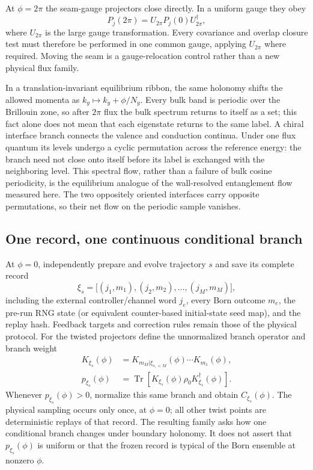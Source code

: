 \documentclass[aps,prx,twocolumn,floatfix,nofootinbib,superscriptaddress,longbibliography]{revtex4-2}
\newcommand{\qTr}{\operatorname{Tr}}
\begin{document}
At $\phi=2\pi$ the seam-gauge projectors close directly.  In a uniform gauge they obey
\begin{equation}
 P_j(2\pi)=U_{2\pi}P_j(0)U_{2\pi}^\dagger,
 \label{eq:large-gauge-controller-closure}
\end{equation}
where $U_{2\pi}$ is the large gauge transformation.  Every covariance and overlap closure
test must therefore be performed in one common gauge, applying $U_{2\pi}$ where required.
Moving the seam is a gauge-relocation control rather than a new physical flux family.

In a translation-invariant equilibrium ribbon, the same holonomy shifts the allowed
momenta as $k_y\mapsto k_y+\phi/N_y$.  Every bulk band is periodic over the Brillouin zone,
so after $2\pi$ flux the bulk spectrum returns to itself as a set; this fact alone does not
mean that each eigenstate returns to the same label.  A chiral interface branch connects
the valence and conduction continua.  Under one flux quantum its levels undergo a cyclic
permutation across the reference energy: the branch need not close onto itself before its
label is exchanged with the neighboring level.  This spectral flow, rather than a failure
of bulk cosine periodicity, is the equilibrium analogue of the wall-resolved entanglement
flow measured here.  The two oppositely oriented interfaces carry opposite permutations,
so their net flow on the periodic sample vanishes.

\subsection{One record, one continuous conditional branch}

At $\phi=0$, independently prepare and evolve trajectory $s$ and save its complete
record
\begin{equation}
 \xi_s=\bigl[(j_1,m_1),(j_2,m_2),\ldots,(j_M,m_M)\bigr],
 \label{eq:frozen-record-word}
\end{equation}
including the external controller/channel word $j_e$, every Born outcome $m_e$, the
pre-run RNG state (or equivalent counter-based initial-state seed map), and the replay
hash.  Feedback targets and correction
rules remain those of the physical protocol.  For the twisted projectors define the
unnormalized branch operator and branch weight
\begin{align}
 K_{\xi_s}(\phi)
 &=K_{m_M|\xi_{s,<M}}(\phi)\cdots K_{m_1}(\phi),\label{eq:frozen-kraus-family}\\
 p_{\xi_s}(\phi)
 &=\qTr\!\left[K_{\xi_s}(\phi)\rho_0K_{\xi_s}^\dagger(\phi)\right].
 \label{eq:frozen-branch-weight}
\end{align}
Whenever $p_{\xi_s}(\phi)>0$, normalize this same branch and obtain
$C_{\xi_s}(\phi)$.  The physical sampling occurs only once, at $\phi=0$; all other twist
points are deterministic replays of that record.  The resulting family asks how one
conditional branch changes under boundary holonomy.  It does not assert that
$p_{\xi_s}(\phi)$ is uniform or that the frozen record is typical of the Born ensemble at
nonzero $\phi$.
\end{document}
